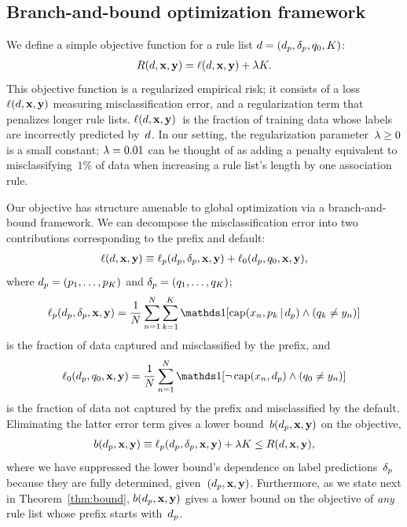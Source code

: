 \subsection{Branch-and-bound optimization framework}

We define a simple objective function for a rule list ${{d} = (d_p, \delta_p, q_0, K)}$:
\begin{align}
\Obj(\RL, \x, \y) = \Loss(\RL, \x, \y) + \Reg K.
\label{eq:objective}
\end{align}
This objective function is a regularized empirical risk;
it consists of a loss~$\ell({d}, \mathbf{x}, \mathbf{y})$ measuring misclassification error,
and a regularization term that penalizes longer rule lists.
%
$\ell({d}, \mathbf{x}, \mathbf{y})$~is the fraction of training data whose labels are
incorrectly predicted by~${d}$.
%
In our setting, the regularization parameter~${{\lambda} \ge 0}$ is a small constant;
\eg ${{\lambda} = 0.01}$ can be thought of as adding a penalty equivalent to misclassifying~$1\%$
of data when increasing a rule list's length by one association rule.
%

Our objective has structure amenable to global optimization via a branch-and-bound framework.
%
We can decompose the misclassification error into two contributions
corresponding to the prefix and default:
\begin{align}
\Loss(\RL, \x, \y) %
\equiv \Loss_p(\Prefix, \Labels, \x, \y) + \Loss_0(\Prefix, \Default, \x, \y),
\end{align}
where ${d_p = (p_1, \dots, p_K)}$ and ${\delta_p = (q_1, \dots, q_K)}$;
\begin{align}
\Loss_p(\Prefix, \Labels, \x, \y) =
\frac{1}{N} \sum_{n=1}^N \sum_{k=1}^K \one [ \Cap(x_n, p_k \given \Prefix) \wedge (q_k \neq y_n) ]
\label{eq:loss}
\end{align}
is the fraction of data captured and misclassified by the prefix, and
\begin{align}
\Loss_0(\Prefix, \Default, \x, \y) =
\frac{1}{N} \sum_{n=1}^N \one [ \neg\, \Cap(x_n, \Prefix) \wedge (\Default \neq y_n) ]
\end{align}
is the fraction of data not captured by the prefix and misclassified by the default.
%
Eliminating the latter error term gives a lower bound~$b(d_p, \mathbf{x}, \mathbf{y})$ on the objective,
\begin{align}
b(\Prefix, \x, \y) \equiv \Loss_p(\Prefix, \Labels, \x, \y) + \Reg K \le \Obj(\RL, \x, \y),
\label{eq:lower-bound}
\end{align}
where we have suppressed the lower bound's dependence on label predictions~$\delta_p$
because they are fully determined, given~${(d_p, \mathbf{x}, \mathbf{y})}$.
%
Furthermore, as we state next in Theorem~\ref{thm:bound},
$b(d_p, \mathbf{x}, \mathbf{y})$ gives a lower bound on the objective of
\emph{any} rule list whose prefix starts with~$d_p$.

